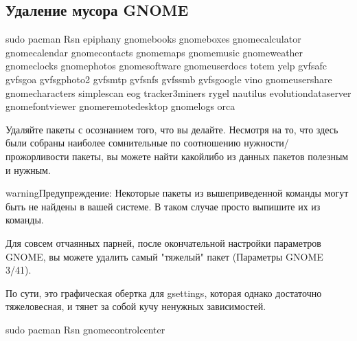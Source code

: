 \documentclass[letterpaper,10pt,russian,openany]{sphinxmanual}
\begin{document}
\subsection{Удаление мусора GNOME}
\label{\detokenize{source/de-optimizations:gnome}}\label{\detokenize{source/de-optimizations:gnome-garbage-removal}}\label{\detokenize{source/de-optimizations:index-2}}
\begin{sphinxVerbatim}[commandchars=\\\{\}]
sudo pacman \PYGZhy{}Rsn epiphany gnome\PYGZhy{}books gnome\PYGZhy{}boxes gnome\PYGZhy{}calculator gnome\PYGZhy{}calendar gnome\PYGZhy{}contacts gnome\PYGZhy{}maps gnome\PYGZhy{}music gnome\PYGZhy{}weather gnome\PYGZhy{}clocks gnome\PYGZhy{}photos gnome\PYGZhy{}software gnome\PYGZhy{}user\PYGZhy{}docs totem yelp gvfs\PYGZhy{}afc gvfs\PYGZhy{}goa gvfs\PYGZhy{}gphoto2 gvfs\PYGZhy{}mtp gvfs\PYGZhy{}nfs gvfs\PYGZhy{}smb gvfs\PYGZhy{}google vino gnome\PYGZhy{}user\PYGZhy{}share gnome\PYGZhy{}characters simple\PYGZhy{}scan eog tracker3\PYGZhy{}miners rygel nautilus evolution\PYGZhy{}data\PYGZhy{}server gnome\PYGZhy{}font\PYGZhy{}viewer gnome\PYGZhy{}remote\PYGZhy{}desktop gnome\PYGZhy{}logs orca
\end{sphinxVerbatim}

\sphinxAtStartPar
{} Удаляйте пакеты с осознанием того, что вы делайте.
Несмотря на то, что здесь были собраны наиболее сомнительные по соотношению нужности/прожорливости пакеты,
вы можете найти какой\sphinxhyphen{}либо из данных пакетов полезным и нужным.

\begin{sphinxadmonition}{warning}{Предупреждение:}
\sphinxAtStartPar
Некоторые пакеты из вышеприведенной команды могут быть не найдены в вашей системе.
В таком случае просто выпишите их из команды.
\end{sphinxadmonition}

\sphinxAtStartPar
Для совсем отчаянных парней, после окончательной настройки параметров GNOME,
вы можете удалить самый "тяжелый" пакет  (Параметры GNOME 3/41).

\sphinxAtStartPar
По сути, это графическая обертка для gsettings, которая однако достаточно тяжеловесная, и тянет за собой кучу ненужных зависимостей.

\begin{sphinxVerbatim}[commandchars=\\\{\}]
sudo pacman \PYGZhy{}Rsn gnome\PYGZhy{}control\PYGZhy{}center
\end{sphinxVerbatim}
\end{document}
